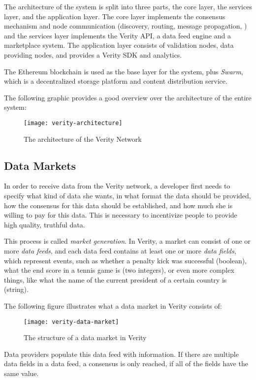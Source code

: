 The architecture of the system is split into three parts, the core layer, the services layer, and the application layer. The core layer implements the consensus mechanism and node communication (discovery, routing, message propagation, \etc) and the services layer implements the Verity API, a data feed engine and a marketplace system. The application layer consists of validation nodes, data providing nodes, and provides a Verity SDK and analytics.

The Ethereum blockchain is used as the base layer for the system, plus \emph{Swarm}, which is a decentralized storage platform and content distribution service\cite{swarm-homepage}.

The following graphic provides a good overview over the architecture of the entire system:
\begin{figure}[H]
\centering
\texttt{[image: verity-architecture]}
\caption{The architecture of the Verity Network\cite{veritywhitepaper}}
\end{figure}

\subsection*{Data Markets}
In order to receive data from the Verity network, a developer first needs to specify what kind of data she wants, in what format the data should be provided, how the consensus for this data should be established, and how much she is willing to pay for this data\cite{veritywhitepaper}. This is necessary to incentivize people to provide high quality, truthful data.

This process is called \emph{market generation}. In Verity, a market can consist of one or more \emph{data feeds}, and each data feed contains at least one or more \emph{data fields}, which represent events, such as whether a penalty kick was successful (boolean), what the end score in a tennis game is (two integers), or even more complex things, like what the name of the current president of a certain country is (string).

The following figure illustrates what a data market in Verity consists of:
\begin{figure}[H]
\centering
\texttt{[image: verity-data-market]}
\caption{The structure of a data market in Verity}
\end{figure}

Data providers populate this data feed with information. If there are multiple data fields in a data feed, a consensus is only reached, if all of the fields have the same value. 


